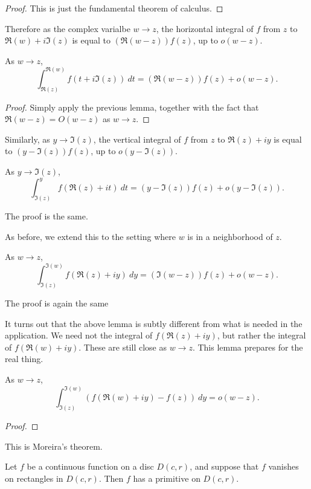  \begin{proof}

 This is just the fundamental theorem of calculus.

 \end{proof}


Therefore as the complex varialbe $w \to z$, the horizontal integral of $f$ from $z$ to
$\Re(w)+i\Im(z)$ is equal to $(\Re(w - z)) f(z)$, up to $o(w - z)$.
\begin{lemma}
  \label{deriv_of_wedgeInt_re}
  \leanok
  As $w \to z$,
  $$
    \int_{\Re(z)}^{\Re(w)} f(t + i\Im(z))\ dt
    =
    (\Re(w-z)) f(z)
    +
    o(w-z)
    .
  $$
\end{lemma}


 \begin{proof}

 Simply apply the previous lemma, together with the fact that $\Re(w - z) = O(w - z)$ as $w \to z$.

 \end{proof}


Similarly, as $y \to \Im(z)$, the vertical integral of $f$ from $z$ to $\Re(z)+iy$ is equal to
$(y - \Im(z)) f(z)$, up to $o(y - \Im(z))$.
\begin{lemma}
  \label{deriv_of_wedgeInt_im'}
  \leanok
  As $y \to \Im(z)$,
  $$
    \int_{\Im(z)}^y f(\Re(z)+it)\ dt
    =
    (y-\Im(z)) f(z)
    +
    o(y-\Im(z))
    .
  $$
\end{lemma}
The proof is the same.



As before, we extend this to the setting where $w$ is in a neighborhood of $z$.
\begin{lemma}
  \label{deriv_of_wedgeInt_im''}
  \leanok
  As $w \to z$,
  $$
    \int_{\Im(z)}^{\Im(w)} f(\Re(z)+iy)\ dy
    =
    (\Im(w-z)) f(z)
    +
    o(w-z)
    .
  $$
\end{lemma}
The proof is again the same



It turns out that the above lemma is subtly different from what is needed in the application.
We need not the integral of $f(\Re(z)+iy)$, but rather the integral of $f(\Re(w)+iy)$. These are
still close as $w \to z$. This lemma prepares for the real thing.
\begin{lemma}
  \label{deriv_of_wedgeInt_im'''}
  As $w \to z$,
  $$
    \int_{\Im(z)}^{\Im(w)} (f(\Re(w)+iy) - f (z))\ dy
    =
    o(w-z)
    .
  $$
\end{lemma}


 \begin{proof}

 \end{proof}


This is Moreira's theorem.
\begin {theorem}
\label {moreira}
\leanok
Let $f$ be a continuous function on a disc $D(c,r)$, and suppose that $f$ vanishes on rectangles in $D(c,r)$. Then $f$ has a primitive on $D(c,r)$.
\end {theorem}


